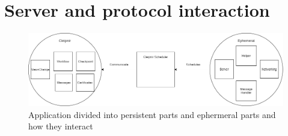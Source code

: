 

\section{Server and protocol interaction}

\begin{figure}
	\includegraphics[width=\linewidth]{figures/CleipnirStructurever1}
	\caption{Application divided into persistent parts and ephermeral parts and how they interact}
	\label{fig:PersistencyEphemeral}
\end{figure}